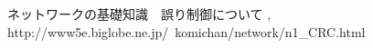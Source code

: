 \documentclass[a4j]{celb-report}
\begin{document}

\begin{thebibliography}{9}
 ネットワークの基礎知識　誤り制御について , http://www5e.biglobe.ne.jp/~komichan/network/n1\_CRC.html
\end{thebibliography}
%
\end{document}
